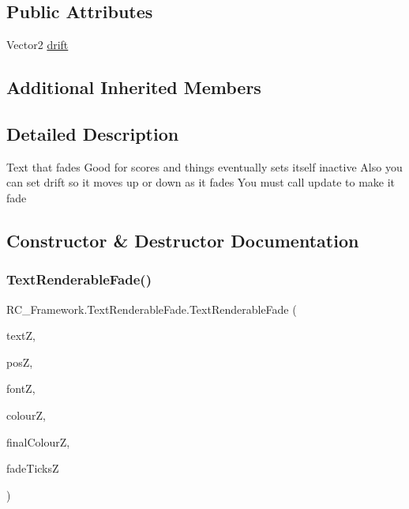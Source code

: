 \subsection*{Public Attributes}
\begin{DoxyCompactItemize}
\item 
Vector2 \mbox{\hyperlink{class_r_c___framework_1_1_text_renderable_fade_a887f3d6bb4b2dc61be19ae5e843ae478}{drift}}
\end{DoxyCompactItemize}
\subsection*{Additional Inherited Members}


\subsection{Detailed Description}
Text that fades Good for scores and things eventually sets itself inactive Also you can set drift so it moves up or down as it fades You must call update to make it fade 



\subsection{Constructor \& Destructor Documentation}
\mbox{\label{class_r_c___framework_1_1_text_renderable_fade_afb0c50102dc8e9ca366459d671e34f69}} 
\subsubsection{\texorpdfstring{Text\+Renderable\+Fade()}{TextRenderableFade()}}
{\footnotesize\ttfamily R\+C\+\_\+\+Framework.\+Text\+Renderable\+Fade.\+Text\+Renderable\+Fade (\begin{DoxyParamCaption}\item[{string}]{textZ,  }\item[{Vector2}]{posZ,  }\item[{Sprite\+Font}]{fontZ,  }\item[{Color}]{colourZ,  }\item[{Color}]{final\+ColourZ,  }\item[{int}]{fade\+TicksZ }\end{DoxyParamCaption})}



